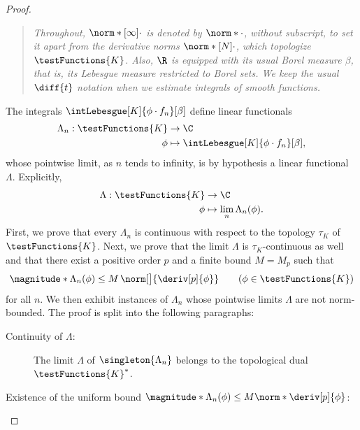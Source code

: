 \begin{proof}\leavevmode
%
\begin{quote}\textit{\noindent%
  Throughout, $\norm*[\infty]{\cdot}$ is denoted by $\norm*{\cdot}$, without subscript, %
  to set it apart from the derivative norms %
  $\norm*[N]{\cdot}$, which topologize $\testFunctions{K}$. Also, $\R$ is equipped with its usual Borel measure $\beta$, %
  that is, its Lebesgue measure restricted to Borel sets. We keep the usual $\diff{t}$ notation when we estimate integrals of %
  smooth functions.}
\end{quote}
%
The integrals $\intLebesgue[K]{\phi \cdot f_n}[\beta]$ define linear functionals 
% 
\begin{align}
  \Lambda_n: \testFunctions{K} &\to \C \\
  \phi & \mapsto \intLebesgue[K]{\phi \cdot f_n}[\beta], \nonumber
\end{align}
% 
whose pointwise limit, as $n$ tends to infinity, is by hypothesis a linear functional $\Lambda$. Explicitly, 
% 
\begin{align}
  \Lambda: \testFunctions{K} & \to \C \\
                        \phi & \mapsto \lim_{n} \Lambda_n (\phi). \nonumber
\end{align}
%
First, we prove that every $\Lambda_n$ is continuous with respect to the topology $\tau_K$ of $\testFunctions{K}$. Next, we %
prove that the limit $\Lambda$ is $\tau_K$-continuous as well and that there exist a positive order $p$ and a finite bound %
$M=M_p$ such that 
% 
\begin{equation} \label{2.3:norm-p-bound}
  \magnitude*{\Lambda_n(\phi)} \leq M \, \norm[\big]{\deriv[p]{\phi}} \qquad (\phi \in \testFunctions{K}) %
\end{equation}
% 
for all $n$. We then exhibit instances of $\Lambda_n$ whose pointwise limits $\Lambda$ are not norm-bounded. %
The proof is split into the following paragraphs:
%
\begin{description}
  \item[Continuity of $\Lambda$:]{%
    The limit $\Lambda$ of $\singleton{\Lambda_n}$ belongs to the topological dual $\testFunctions{K}^\ast$.
  }
  \item[{Existence of the uniform bound $\magnitude*{\Lambda_n(\phi)}\leq M \norm*{\deriv[p]{\phi}}$:}]{%
}
\end{description}
\end{proof}
